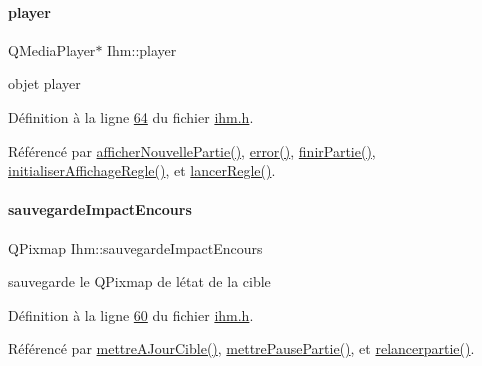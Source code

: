 \paragraph{\texorpdfstring{player}{player}}
{\footnotesize\ttfamily Q\+Media\+Player$\ast$ Ihm\+::player\hspace{0.3cm}{\ttfamily [private]}}



objet player 



Définition à la ligne \hyperlink{ihm_8h_source_l00064}{64} du fichier \hyperlink{ihm_8h_source}{ihm.\+h}.



Référencé par \hyperlink{ihm_8cpp_source_l00383}{afficher\+Nouvelle\+Partie()}, \hyperlink{ihm_8cpp_source_l00690}{error()}, \hyperlink{ihm_8cpp_source_l00365}{finir\+Partie()}, \hyperlink{ihm_8cpp_source_l00605}{initialiser\+Affichage\+Regle()}, et \hyperlink{ihm_8cpp_source_l00623}{lancer\+Regle()}.

\mbox{\label{class_ihm_a659c67bf5d1ba3104fb10f23d8b91b37}} 
\paragraph{\texorpdfstring{sauvegarde\+Impact\+Encours}{sauvegardeImpactEncours}}
{\footnotesize\ttfamily Q\+Pixmap Ihm\+::sauvegarde\+Impact\+Encours\hspace{0.3cm}{\ttfamily [private]}}



sauvegarde le Q\+Pixmap de l\textquotesingle{}état de la cible 



Définition à la ligne \hyperlink{ihm_8h_source_l00060}{60} du fichier \hyperlink{ihm_8h_source}{ihm.\+h}.



Référencé par \hyperlink{ihm_8cpp_source_l00565}{mettre\+A\+Jour\+Cible()}, \hyperlink{ihm_8cpp_source_l00519}{mettre\+Pause\+Partie()}, et \hyperlink{ihm_8cpp_source_l00539}{relancerpartie()}.

\mbox{\label{class_ihm_a1a9d23dd4defa0b88d1e4a56ce807e45}} 
